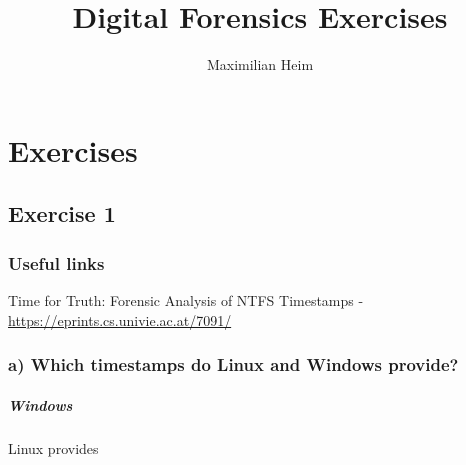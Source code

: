 \documentclass[10pt,a4paper]{report}
\author{Maximilian Heim}
\title{Digital Forensics Exercises}
\begin{document}
\chapter{Exercises}
\section{Exercise 1}
\subsection{Useful links}
Time for Truth: Forensic Analysis of NTFS Timestamps - \url{https://eprints.cs.univie.ac.at/7091/}
\subsection{a) Which timestamps do Linux and Windows provide?}
\paragraph{Windows}
Linux provides \cite{timestampsunderntfs} 




\end{document}
